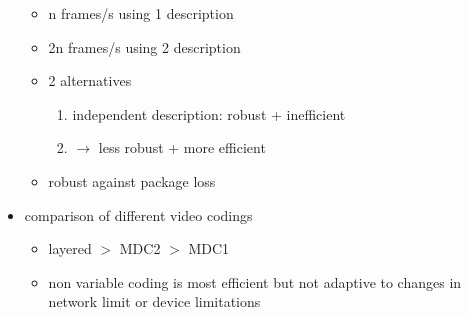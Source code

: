 \documentclass[a4paper,10pt]{scrreprt}
\begin{document}
\begin{itemize}
\begin{itemize}
 \item n frames/s using 1 description 
 \item 2n frames/s using 2 description
 \item 2 alternatives 
 \begin{enumerate}
  \item independent description: robust + inefficient 
  \item $\rightarrow$ less robust + more efficient 
 \end{enumerate}
 \item robust against package loss 
\end{itemize}
\item comparison of different video codings
\begin{itemize}
 \item layered $>$ MDC2 $>$ MDC1 
 \item non variable coding is most efficient but not adaptive to changes in network limit or device limitations
\end{itemize}
\end{itemize}
\end{document}
